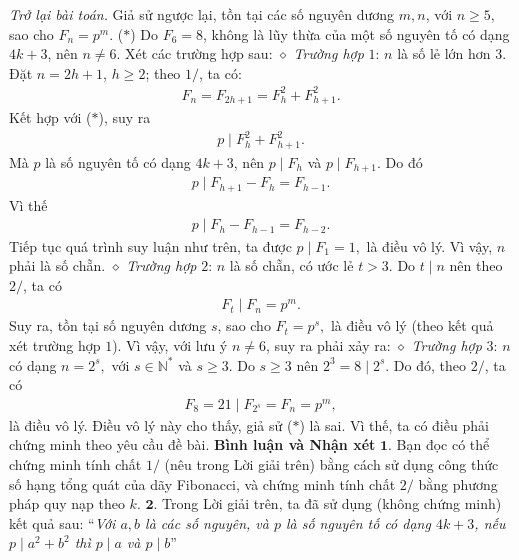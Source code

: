 \begin{multicols}{2}
	\vskip 0.05cm
	\textit{Trở lại bài toán.}
	\vskip 0.05cm
	Giả sử ngược lại, tồn tại các số nguyên dương $m, n$, với $n \ge 5$, sao cho  $F_n = p^m$. \hfill ($*$)
	\vskip 0.05cm
	Do $F_6 = 8$, không là lũy thừa của một số nguyên tố có dạng $4k + 3$, nên $n \ne 6$.
	\vskip 0.05cm
	Xét các trường hợp sau:
	\vskip 0.05cm
	$\diamond$ \textit{Trường hợp} $1$: $n$ là số lẻ lớn hơn $3$.
	\vskip 0.05cm
	Đặt $n = 2h + 1$, $h \ge 2$; theo $1/$, ta có:
	\begin{align*}
		{F_n} = {F_{2h + 1}} = F_h^2 + F_{h + 1}^2.
	\end{align*}
	Kết hợp với ($*$), suy ra
	\begin{align*}
		p\mid F_h^2 + F_{h + 1}^2.
	\end{align*}
	Mà $p$ là số nguyên tố có dạng $4k + 3$, nên $p\mid {F_h}$ và $p\mid {F_{h + 1}}$.  Do đó
	\begin{align*}
		p\mid{F_{h + 1}} - {F_h} = {F_{h - 1}}.
	\end{align*}
	Vì thế
	\begin{align*}
		p\mid{F_h} - {F_{h - 1}} = {F_{h - 2}}.
	\end{align*}
	Tiếp tục quá trình suy luận như trên, ta được $p\mid{F_1} = 1,$  là điều vô lý. Vì vậy, $n$ phải là số chẵn.
	\vskip 0.05cm
	$\diamond$ \textit{Trường hợp} $2$: $n$ là số chẵn, có ước lẻ $t > 3$.
	\vskip 0.05cm
	Do $t \mid n $  nên theo $2/$, ta có
	\begin{align*}
		{F_t}\mid{F_n} = {p^m}. 
	\end{align*}
	Suy ra, tồn tại số nguyên dương $s$, sao cho ${F_t} = {p^s},$ là điều vô lý (theo kết quả xét trường hợp $1$). Vì vậy, với lưu ý $n \ne 6$, suy ra phải xảy ra:
	\vskip 0.05cm
	$\diamond$ \textit{Trường hợp} $3$: $n$ có dạng $n = {2^s},$ với $s \in \mathbb{N^*}$ và $s \ge 3$.
	\vskip 0.05cm
	Do $s \ge 3$ nên  ${2^3} = 8\mid{2^s}$. Do đó, theo $2/$, ta có
	\begin{align*}
		{F_8} = 21\mid{F_{{2^s}}} = {F_n} = {p^m},
	\end{align*}
	là điều vô lý. Điều vô lý này cho thấy, giả sử ($*$) là sai. Vì thế, ta có điều phải chứng minh theo yêu cầu đề bài.
	\vskip 0.05cm
	\textbf{\color{thachthuctoanhoc}Bình luận và Nhận xét}
	\vskip 0.05cm
	$\pmb{1.}$ Bạn đọc có thể chứng minh tính chất $1/$ (nêu trong Lời giải trên) bằng cách sử dụng công thức số hạng tổng quát của dãy Fibonacci, và chứng minh tính chất $2/$ bằng phương pháp quy nạp theo $k$.
	\vskip 0.05cm
	$\pmb{2.}$ Trong Lời giải trên, ta đã sử dụng (không chứng minh) kết quả sau:
	\vskip 0.05cm
	“\textit{Với $a, b$ là các số nguyên, và $p$ là số nguyên tố có dạng $4k + 3$, nếu $p\mid{a^2} + {b^2}$  thì  $p \mid a$ và  $p \mid b$}”

\end{multicols}

